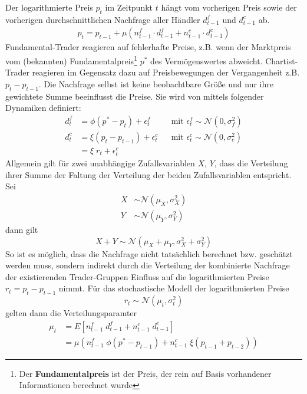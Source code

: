 \documentclass[ngerman]{ttlab-qualify}
\begin{document}
Der logarithmierte Preis $p_t$ im Zeitpunkt $t$ hängt vom vorherigen Preis sowie der vorherigen durchschnittlichen Nachfrage aller Händler $d_{t-1}^f$ und $d_{t-1}^c$ ab. 
\begin{align}
p_t = p_{t-1} + \mu (n_{t-1}^f\cdot d_{t-1}^f + n_{t-1}^c\cdot d_{t-1}^c)
\end{align}
Fundamental-Trader reagieren auf fehlerhafte Preise, z.B. wenn der Marktpreis vom (bekannten) Fundamentalpreis\footnote{Der \textbf{Fundamentalpreis} ist der Preis, der rein auf Basis vorhandener Informationen berechnet wurde} $p^*$ des Vermögenswertes abweicht. Chartist-Trader reagieren im Gegensatz dazu auf Preisbewegungen der Vergangenheit z.B. $p_t-p_{t-1}$.
Die Nachfrage selbst ist keine beobachtbare Größe und nur ihre gewichtete Summe beeinflusst die Preise. Sie wird von \parencite{bertschinger:2018,FW:2011} mittels folgender Dynamiken definiert:
\begin{align}
d_t^f &= \phi (p^*-p_t)+\epsilon_t^f & &\text{mit }\epsilon_t^f\sim \mathcal{N}(0,\sigma^2_f)\nonumber \\
d_t^c &= \xi (p_t-p_{t-1})+\epsilon_t^c & &\text{mit }\epsilon_t^c\sim \mathcal{N}(0,\sigma^2_c)\nonumber \\
&=\xi \; r_t +\epsilon_t^c \nonumber
\end{align}
Allgemein gilt für zwei unabhängige Zufallsvariablen $X$, $Y$, dass die Verteilung ihrer Summe der Faltung der Verteilung der beiden Zufallsvariablen entspricht.\\
Sei
\begin{align}
X&\sim \mathcal{N}(\mu_X, \sigma_X^2)\nonumber \\
Y&\sim \mathcal{N}(\mu_Y,\sigma_Y^2)\nonumber
\end{align}
dann gilt
\[X+Y\sim\mathcal{N}(\mu_X+\mu_Y,\sigma_X^2+\sigma_Y^2)\]
So ist es möglich, dass die Nachfrage nicht tatsächlich berechnet bzw. geschätzt werden muss, sondern indirekt durch die Verteilung der kombinierte Nachfrage der existierenden Trader-Gruppen Einfluss auf die logarithmierten Preise $r_t = p_t-p_{t-1}$ nimmt.
Für das stochastische Modell der logarithmierten Preise 
\[r_t\sim\mathcal{N}(\mu_t,\sigma_t^2)\]
gelten dann die Verteilungsparamter
\begin{align}
\mu_t&= E[n_{t-1}^f\; d_{t-1}^f + n_{t-1}^c\; d_{t-1}^c]\nonumber\\
&=\mu (n_{t-1}^f\; \phi(p^*-p_{t-1}) +n_{t-1}^c\; \xi (p_{t-1}+p_{t-2}))
\end{align}
\end{document}
